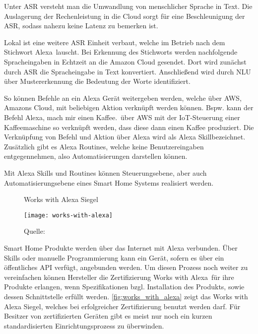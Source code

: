 Unter \ac{ASR} versteht man die Umwandlung von menschlicher Sprache in Text.
Die Auslagerung der Rechenleistung in die Cloud sorgt für eine Beschleunigung der \ac{ASR}, sodass nahezu keine Latenz zu bemerken ist.

Lokal ist eine weitere \ac{ASR} Einheit verbaut, welche im Betrieb nach dem Stichwort \glqq Alexa\grqq \ lauscht.
Bei Erkennung des Stichworts werden nachfolgende Spracheingaben in Echtzeit an die Amazon Cloud gesendet.
Dort wird zunächst durch \ac{ASR} die Spracheingabe in Text konvertiert.
Anschließend wird durch \ac{NLU} über Mustererkennung die Bedeutung der Worte identifiziert. 

So können Befehle an ein Alexa Gerät weitergeben werden, welche über \ac{AWS}, Amazons Cloud, mit beliebigen Aktion verknüpft werden können.
Bspw. kann der Befehl \glqq Alexa, mach mir einen Kaffee.\grqq \ über \ac{AWS} mit der \ac{IoT}-Steuerung einer Kaffeemaschine so verknüpft werden, dass diese dann einen Kaffee produziert.
Die Verknüpfung von Befehl und Aktion über Alexa wird als \glqq Alexa Skill\grqq bezeichnet.
Zusätzlich gibt es \glqq Alexa Routines\grqq, welche keine Benutzereingaben entgegennehmen, also Automatisierungen darstellen können.

Mit Alexa Skills und Routines können Steuerungsebene, aber auch Automatisierungsebene eines Smart Home Systems realisiert werden.

\begin{wrapfigure}{r}{0.35\textwidth}
	\centering
	\caption{Works with Alexa Siegel}
	\texttt{[image: works-with-alexa]}
	\caption*{\footnotesize{Quelle: }}
	\label{fig:works_with_alexa}
\end{wrapfigure}

Smart Home Produkte werden über das Internet mit Alexa verbunden.
Über Skills oder manuelle Programmierung kann ein Gerät, sofern es über ein öffentliches \ac{API} verfügt, angebunden werden.
Um diesen Prozess noch weiter zu vereinfachen können Hersteller die Zertifizierung \glqq Works with Alexa\grqq \ für ihre Produkte erlangen, wenn Spezifikationen bzgl. Installation des Produkts, sowie dessen Schnittstelle erfüllt werden.
\autoref{fig:works_with_alexa} zeigt das Works with Alexa Siegel, welches bei erfolgreicher Zertifizierung benutzt werden darf.
Für Besitzer von zertifizierten Geräten gibt es meist nur noch ein kurzen standardisierten Einrichtungsprozess zu überwinden.

